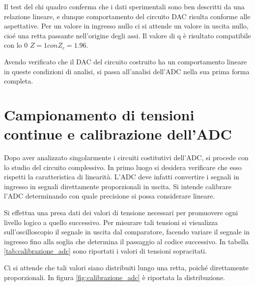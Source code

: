 \documentclass[journal]{IEEEtran}
\begin{document}
Il test del chi quadro conferma che i dati sperimentali sono ben descritti da una relazione lineare, e dunque comportamento del circuito DAC risulta conforme alle aspettative. Per un valore in ingresso nullo ci si attende un valore in uscita nullo, cioé una retta passante nell'origine degli assi. Il valore di q è risultato compatibile con lo 0 $Z = 1 con Z_c = 1.96$.

Avendo verificato che il DAC del circuito costruito ha un comportamento lineare in queste condizioni di analisi, si passa all'analisi dell'ADC nella sua prima forma completa.



\section{Campionamento di tensioni continue e calibrazione dell'ADC}
Dopo aver analizzato singolarmente i circuiti costitutivi dell'ADC, si procede con lo studio del circuito complessivo.
In primo luogo si desidera verificare che esso rispetti la caratteristica di linearità. L'ADC deve infatti convertire i segnali in ingresso in segnali direttamente proporzionali in uscita. Si intende calibrare l'ADC determinando con quale precisione si possa considerare lineare.

Si effettua una presa dati dei valori di tensione necessari per promuovere ogni livello logico a quello successivo. Per misurare tali tensioni si visualizza sull'oscilloscopio il segnale in uscita dal comparatore, facendo variare il segnale in ingresso fino alla soglia che determina il passaggio al codice successivo.
In tabella \ref{tab:calibrazione_adc} sono riportati i valori di tensioni sopracitati.

Ci si attende che tali valori siano distribuiti lungo una retta, poiché direttamente proporzionali. In figura \ref{fig:calibrazione_adc} è riportata la distribuzione. 
\end{document}
